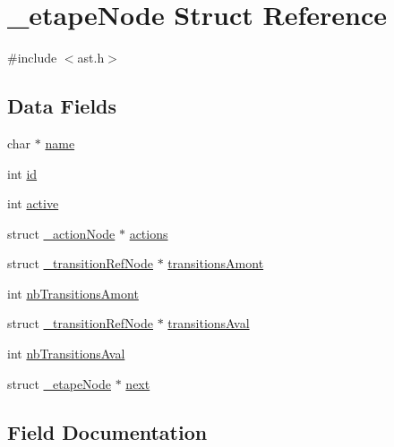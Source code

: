 \hypertarget{struct__etape_node}{}\section{\+\_\+etape\+Node Struct Reference}
\label{struct__etape_node}


{\ttfamily \#include $<$ast.\+h$>$}

\subsection*{Data Fields}
\begin{DoxyCompactItemize}
\item 
char $\ast$ \hyperlink{struct__etape_node_a5ac083a645d964373f022d03df4849c8}{name}
\item 
int \hyperlink{struct__etape_node_a7441ef0865bcb3db9b8064dd7375c1ea}{id}
\item 
int \hyperlink{struct__etape_node_aa5805c5e936174e5092bf7a5b78e7e64}{active}
\item 
struct \hyperlink{struct__action_node}{\+\_\+action\+Node} $\ast$ \hyperlink{struct__etape_node_abdc533bc676795d853da4457392bb444}{actions}
\item 
struct \hyperlink{struct__transition_ref_node}{\+\_\+transition\+Ref\+Node} $\ast$ \hyperlink{struct__etape_node_ab019a62049ce1847642f4e3953d88cba}{transitions\+Amont}
\item 
int \hyperlink{struct__etape_node_a9c81dedd6f8d78a01dd0545bf9c47b7b}{nb\+Transitions\+Amont}
\item 
struct \hyperlink{struct__transition_ref_node}{\+\_\+transition\+Ref\+Node} $\ast$ \hyperlink{struct__etape_node_a0e3579f485181a5dcbcca301d24a2b74}{transitions\+Aval}
\item 
int \hyperlink{struct__etape_node_af3650cfdb0e70be600cdce601acc6146}{nb\+Transitions\+Aval}
\item 
struct \hyperlink{struct__etape_node}{\+\_\+etape\+Node} $\ast$ \hyperlink{struct__etape_node_a7612e1c7a3508d0016f935522a22bea3}{next}
\end{DoxyCompactItemize}


\subsection{Field Documentation}
\mbox{\label{struct__etape_node_abdc533bc676795d853da4457392bb444}} 
